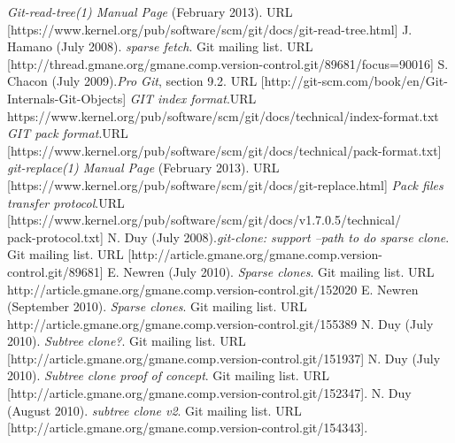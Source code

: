 \documentclass[preprint]{sigplanconf}
\begin{document}
\begin{thebibliography}{10}
     \emph{Git-read-tree(1) Manual Page} (February
      2013). \newblock URL
      [https://www.kernel.org/pub/software/scm/git/docs/git-read-tree.html]
     J. Hamano (July 2008). \newblock \emph{sparse fetch}.
    \newblock Git mailing list. \newblock URL
      [http://thread.gmane.org/gmane.comp.version-control.git/89681/focus=90016]
     S. Chacon (July 2009).\newblock\emph{Pro Git}, section 9.2.
      \newblock URL
      [http://git-scm.com/book/en/Git-Internals-Git-Objects]
       \emph{GIT index format}.\newblock URL
      https://www.kernel.org/pub/software/scm/git/docs/technical/index-format.txt
     \emph{GIT pack format}.\newblock URL
      [https://www.kernel.org/pub/software/scm/git/docs/technical/pack-format.txt]
     \emph{git-replace(1) Manual Page} (February 2013).\newblock
      URL [https://www.kernel.org/pub/software/scm/git/docs/git-replace.html]
     \emph{Pack files transfer protocol}.\newblock URL
      [https://www.kernel.org/pub/software/scm/git/docs/v1.7.0.5/technical/\\
      pack-protocol.txt]
    N. Duy (July 2008).\newblock \emph{git-clone: support --path
      to do sparse clone}. \newblock Git mailing list. \newblock URL
      [http://article.gmane.org/gmane.comp.version-control.git/89681]
    E. Newren (July 2010). \newblock \emph{Sparse clones}.
      \newblock Git mailing list. \newblock URL
      http://article.gmane.org/gmane.comp.version-control.git/152020
    E. Newren (September 2010). \newblock \emph{Sparse
      clones}.  \newblock Git mailing list. \newblock URL
      http://article.gmane.org/gmane.comp.version-control.git/155389
    N. Duy (July 2010). \newblock \emph{Subtree clone?}. \newblock
      Git mailing list. \newblock URL
      [http://article.gmane.org/gmane.comp.version-control.git/151937]
    N. Duy (July 2010). \newblock \emph{Subtree clone proof of
    concept}. \newblock Git mailing list. \newblock URL
    [http://article.gmane.org/gmane.comp.version-control.git/152347].
    N. Duy (August 2010). \newblock \emph{subtree clone v2}.
    \newblock Git mailing list. \newblock
    URL [http://article.gmane.org/gmane.comp.version-control.git/154343].
\end{thebibliography}
\end{document}
